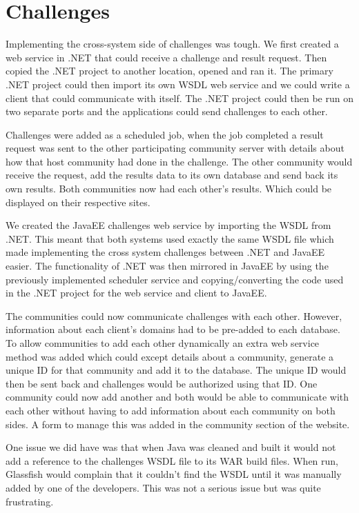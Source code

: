 \section{Challenges}
Implementing the cross-system side of challenges was tough. We first created a web service in .NET that could receive a challenge and result request. Then copied the .NET project to another location, opened and ran it. The primary .NET project could then import its own WSDL web service and we could write a client that could communicate with itself. The .NET project could then be run on two separate ports and the applications could send challenges to each other. \par
Challenges were added as a scheduled job, when the job completed a result request was sent to the other participating community server with details about how that host community had done in the challenge. The other community would receive the request, add the results data to its own database and send back its own results. Both communities now had each other’s results. Which could be displayed on their respective sites. \par
We created the JavaEE challenges web service by importing the WSDL from .NET. This meant that both systems used exactly the same WSDL file which made implementing the cross system challenges between .NET and JavaEE easier. The functionality of .NET was then mirrored in JavaEE by using the previously implemented scheduler service and copying/converting the code used in the .NET project for the web service and client to JavaEE. \par
The communities could now communicate challenges with each other. However, information about each client’s domains had to be pre-added to each database. To allow communities to add each other dynamically an extra web service method was added which could except details about a community, generate a unique ID for that community and add it to the database. The unique ID would then be sent back and challenges would be authorized using that ID. One community could now add another and both would be able to communicate with each other without having to add information about each community on both sides. A form to manage this was added in the community section of the website. \par
One issue we did have was that when Java was cleaned and built it would not add a reference to the challenges WSDL file to its WAR build files. When run, Glassfish would complain that it couldn’t find the WSDL until it was manually added by one of the developers. This was not a serious issue but was quite frustrating. \par
